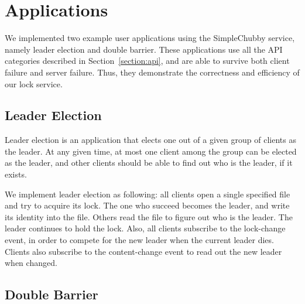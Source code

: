 \section{Applications}
\label{section:apps}

We implemented two example user applications using the SimpleChubby service,
namely leader election and double barrier. These applications use all the
API categories described in Section~\ref{section:api}, and are able to
survive both client failure and server failure. Thus, they demonstrate
the correctness and efficiency of our lock service.

\subsection{Leader Election}

Leader election is an application that elects one out of a given group
of clients as the leader. At any given time, at most one client among the
group can be elected as the leader, and other clients should be able to
find out who is the leader, if it exists.

We implement leader election as following: all clients open a single
specified file and try to acquire its lock. The one who succeed becomes
the leader, and write its identity into the file. Others read the file
to figure out who is the leader. The leader continues to hold the lock.
Also, all clients subscribe to the lock-change event, in order to compete
for the new leader when the current leader dies. Clients also subscribe
to the content-change event to read out the new leader when changed.

\subsection{Double Barrier}


